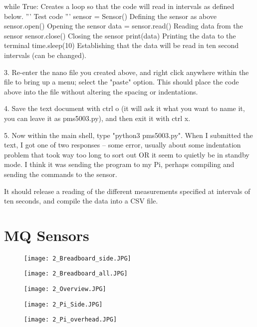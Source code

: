 \documentclass{article}
\begin{document}
  while True:  Creates a loop so that the code will read in intervals as defined below.
    '''
    Test code
    '''
    sensor = Sensor()  Defining the sensor as above
    sensor.open()  Opening the sensor
    data = sensor.read()  Reading data from the sensor
    sensor.close()  Closing the sensor
    print(data)  Printing the data to the terminal
    time.sleep(10)  Establishing that the data will be read in ten second intervals (can be changed).


3.  Re-enter the nano file you created above, and right click anywhere within the file to bring up a menu; select the "paste" option.  This should place the code above into the file without altering the spacing or indentations.

4.  Save the text document with ctrl o (it will ask it what you want to name it, you can leave it as pms5003.py), and then exit it with ctrl x.

5.  Now within the main shell, type "python3 pms5003.py". When I submitted the text, I got one of two responses -- some error, usually about some indentation problem that took way too long to sort out OR it seem to quietly be in standby mode. I think it was sending the program to my Pi, perhaps compiling and sending the commands to the sensor.  

It should release a reading of the different measurements specified at intervals of ten seconds, and compile the data into a CSV file.

\section{MQ Sensors}

\begin{figure}
\texttt{[image: 2\_Breadboard\_side.JPG]}
\end{figure}

\begin{figure}
\texttt{[image: 2\_Breadboard\_all.JPG]}
\end{figure}

\begin{figure}
\texttt{[image: 2\_Overview.JPG]}
\end{figure}

\begin{figure}
\texttt{[image: 2\_Pi\_Side.JPG]}
\end{figure}

\begin{figure}
\texttt{[image: 2\_Pi\_overhead.JPG]}
\end{figure}
\end{document}
